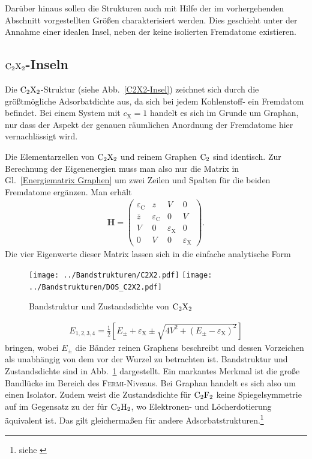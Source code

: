 \documentclass[a4paper, 10pt, twoside, openany]{book} %
\newcommand \bracks[1]{\left [ #1 \right ]}
\def \vec {\boldsymbol}
\def \eC {\varepsilon_\mathrm{C}}
\def \eX {\varepsilon_\mathrm{X}}
\def \cX {c_\mathrm{X}}
\begin{document}
	Darüber hinaus sollen die Strukturen auch mit Hilfe der im vorhergehenden Abschnitt vorgestellten Größen charakterisiert werden. Dies geschieht unter der Annahme einer idealen Insel, neben der keine isolierten Fremdatome existieren.
	
	\subsection{$\rm C_2X_2$-Inseln}
	
	Die $\rm C_2X_2$-Struktur (siehe Abb.~\ref{C2X2-Insel}) zeichnet sich durch die größtmögliche Adsorbatdichte aus, da sich bei jedem Kohlenstoff- ein Fremdatom befindet. Bei einem System mit $\cX = 1$ handelt es sich im Grunde um Graphan, nur dass der Aspekt der genauen räumlichen Anordnung der Fremdatome hier vernachlässigt wird.
	
	Die Elementarzellen von $\rm C_2X_2$ und reinem Graphen $\rm C_2$ sind identisch. Zur Berechnung der Eigenenergien muss man also nur die Matrix in Gl.~\ref{Energiematrix Graphen} um zwei Zeilen und Spalten für die beiden Fremdatome ergänzen. Man erhält
	\begin{align*}
		\vec H =
		\begin{pmatrix}
            \eC         & z   &   V &  0 \\
            \overline z & \eC &   0 &  V \\
             V          & 0   & \eX &  0 \\
             0          & V   &   0 & \eX
		\end{pmatrix}.
	\end{align*}
	Die vier Eigenwerte dieser Matrix lassen sich in die einfache analytische Form
	\begin{figure}
		\texttt{[image: ../Bandstrukturen/C2X2.pdf]}
		\hfill
		\texttt{[image: ../Bandstrukturen/DOS\_C2X2.pdf]}
		\caption{Bandstruktur und Zustandsdichte von $\rm C_2X_2$}
		\label{C2X2}
	\end{figure}
	\begin{align*}
		E_{1, 2, 3, 4} = \frac 1 2 \bracks{E_\pm + \eX \pm \sqrt{4 V^2 + (E_\pm - \eX)^2}}
	\end{align*}
	bringen, wobei $E_\pm$ die Bänder reinen Graphens beschreibt und dessen Vorzeichen als unabhängig von dem vor der Wurzel zu betrachten ist. Bandstruktur und Zustandsdichte sind in Abb.~\ref{C2X2} dargestellt. Ein markantes Merkmal ist die große Bandlücke im Bereich des \textsc{Fermi}-Niveaus. Bei Graphan handelt es sich also um einen Isolator. Zudem weist die Zustandsdichte für $\rm C_2F_2$ keine Spiegelsymmetrie auf im Gegensatz zu der für $\rm C_2H_2$, wo Elektronen- und Löcherdotierung äquivalent ist. Das gilt gleichermaßen für andere Adsorbatstrukturen.\footnote{siehe \cite[S. 3]{Wehling2}}
	
\end{document}
